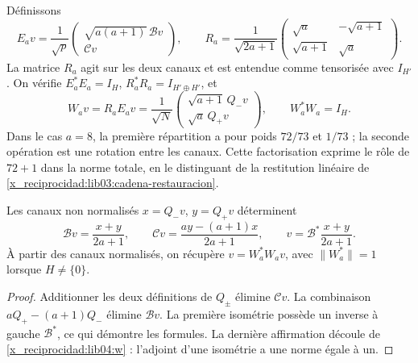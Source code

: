 Définissons
\begin{equation}
 E_av=\frac1{\sqrt p}
 \begin{pmatrix}\sqrt{a(a+1)}\,\mathcal Bv\\\mathcal Cv\end{pmatrix},
 \qquad
 R_a=\frac1{\sqrt{2a+1}}
 \begin{pmatrix}\sqrt a&-\sqrt{a+1}\\
                 \sqrt{a+1}&\sqrt a\end{pmatrix}.
 \label{x_reciprocidad:lib04:factorizacion-er}
\end{equation}
La matrice \(R_a\) agit sur les deux canaux et est entendue comme tensorisée
avec \(I_{H'}\). On vérifie
\(E_a^*E_a=I_H\), \(R_a^*R_a=I_{H'\oplus H'}\), et
\begin{equation}
 W_av=R_aE_av
 =\frac1{\sqrt N}
 \begin{pmatrix}\sqrt{a+1}\,Q_-v\\\sqrt a\,Q_+v\end{pmatrix},
 \qquad W_a^*W_a=I_H.
 \label{x_reciprocidad:lib04:w}
\end{equation}
Dans le cas \(a=8\), la première répartition a pour poids \(72/73\) et
\(1/73\) ; la seconde opération est une rotation entre les canaux.
Cette factorisation exprime le rôle de \(72+1\) dans la norme
totale, en le distinguant de la restitution linéaire de
\eqref{x_reciprocidad:lib03:cadena-restauracion}.

\begin{proposition}
\label{x_reciprocidad:lib04:prop-recuperacion}
Les canaux non normalisés \(x=Q_-v\), \(y=Q_+v\) déterminent
\begin{equation}
 \mathcal Bv=\frac{x+y}{2a+1},\qquad
 \mathcal Cv=\frac{ay-(a+1)x}{2a+1},\qquad
 v=\mathcal B^*\frac{x+y}{2a+1}.
 \label{x_reciprocidad:lib04:inversa-canales}
\end{equation}
À partir des canaux normalisés, on récupère
\(v=W_a^*W_av\), avec \(\|W_a^*\|=1\) lorsque \(H\neq\{0\}\).
\end{proposition}

\begin{proof}
Additionner les deux définitions de \(Q_\pm\) élimine \(\mathcal Cv\). La combinaison \(aQ_+-(a+1)Q_-\) élimine \(\mathcal Bv\). La première isométrie possède un inverse à gauche \(\mathcal B^*\), ce qui démontre les formules. La dernière affirmation découle de \eqref{x_reciprocidad:lib04:w} : l'adjoint d'une isométrie a une norme égale à un.
\end{proof}

